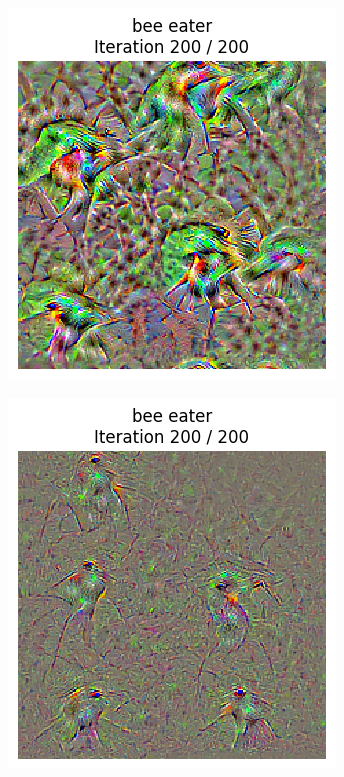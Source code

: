 \begin{figure}[H]
    \centering
    \begin{subfigure}[t]{.33\textwidth}
        \centering
        \includegraphics[width=\linewidth]{figs_propre2/SqueezeNet/SqueezeNet_bird_animated_reg_5_last_frame.png}
        \caption{}
        \label{fig:class_viz_reg:sub1}
    \end{subfigure}%
    \begin{subfigure}[t]{.33\textwidth}
        \centering
        \includegraphics[width=\linewidth]{figs_propre2/SqueezeNet/SqueezeNet_bird_animated_reg_2_last_frame.png}

\end{subfigure}
\end{figure}

